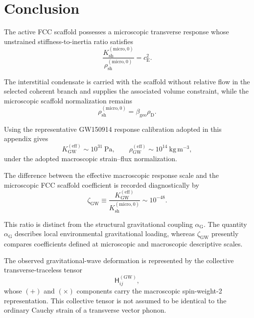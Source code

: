 \section*{Conclusion}

The active FCC scaffold possesses a microscopic transverse response whose unstrained stiffness-to-inertia ratio satisfies
\begin{equation}
    \frac{ K_{\mathrm{sh}}^{(\mathrm{micro},0)} }{ \rho_{\mathrm{sh}}^{(\mathrm{micro},0)} } = c_{\mathrm{E}}^2.
\end{equation}

The interstitial condensate is carried with the scaffold without relative flow in the selected coherent branch and supplies the associated volume constraint, while the microscopic scaffold normalization remains
\begin{equation}
    \rho_{\mathrm{sh}}^{(\mathrm{micro},0)} = \beta_{\mathrm{geo}}\rho_{\mathrm{D}}.
\end{equation}

Using the representative GW150914 response calibration adopted in this appendix gives
\begin{equation}
    K_{\mathrm{GW}}^{(\mathrm{eff})} \sim 10^{31}\ \mathrm{Pa}, \qquad \rho_{\mathrm{GW}}^{(\mathrm{eff})} \sim 10^{14}\ \mathrm{kg\,m^{-3}},
\end{equation}
under the adopted macroscopic strain--flux normalization.

The difference between the effective macroscopic response scale and the microscopic FCC scaffold coefficient is recorded diagnostically by
\begin{equation}
    \zeta_{\mathrm{GW}} \equiv \frac{ K_{\mathrm{GW}}^{(\mathrm{eff})} }{ K_{\mathrm{sh}}^{(\mathrm{micro},0)} } \sim 10^{-48}.
\end{equation}

This ratio is distinct from the structural gravitational coupling $\alpha_{\mathrm{G}}$. The quantity $\alpha_{\mathrm{G}}$ describes local environmental gravitational loading, whereas $\zeta_{\mathrm{GW}}$ presently compares coefficients defined at microscopic and macroscopic descriptive scales.

The observed gravitational-wave deformation is represented by the collective transverse-traceless tensor
\begin{equation}
    \mathsf{H}_{ij}^{(\mathrm{GW})},
\end{equation}
whose $(+)$ and $(\times)$ components carry the macroscopic spin-weight-2 representation. This collective tensor is not assumed to be identical to the ordinary Cauchy strain of a transverse vector phonon.

